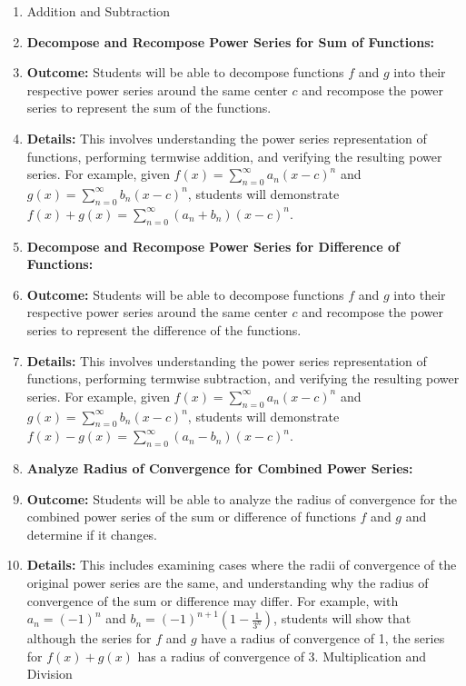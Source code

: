 \begin{enumerate}
    \item Addition and Subtraction
    \item \textbf{Decompose and Recompose Power Series for Sum of Functions:}
    \item \textbf{Outcome:} Students will be able to decompose functions \( f \) and \( g \) into their respective power series around the same center \( c \) and recompose the power series to represent the sum of the functions.
    \item \textbf{Details:} This involves understanding the power series representation of functions, performing termwise addition, and verifying the resulting power series. For example, given \( f(x) = \sum_{n=0}^\infty a_n (x - c)^n \) and \( g(x) = \sum_{n=0}^\infty b_n (x - c)^n \), students will demonstrate \( f(x) + g(x) = \sum_{n=0}^\infty (a_n + b_n) (x - c)^n \).
    \item \textbf{Decompose and Recompose Power Series for Difference of Functions:}
    \item \textbf{Outcome:} Students will be able to decompose functions \( f \) and \( g \) into their respective power series around the same center \( c \) and recompose the power series to represent the difference of the functions.
    \item \textbf{Details:} This involves understanding the power series representation of functions, performing termwise subtraction, and verifying the resulting power series. For example, given \( f(x) = \sum_{n=0}^\infty a_n (x - c)^n \) and \( g(x) = \sum_{n=0}^\infty b_n (x - c)^n \), students will demonstrate \( f(x) - g(x) = \sum_{n=0}^\infty (a_n - b_n) (x - c)^n \).
    \item \textbf{Analyze Radius of Convergence for Combined Power Series:}
    \item \textbf{Outcome:} Students will be able to analyze the radius of convergence for the combined power series of the sum or difference of functions \( f \) and \( g \) and determine if it changes.
    \item \textbf{Details:} This includes examining cases where the radii of convergence of the original power series are the same, and understanding why the radius of convergence of the sum or difference may differ. For example, with \( a_n = (-1)^n \) and \( b_n = (-1)^{n+1} \left(1 - \frac{1}{3^n}\right) \), students will show that although the series for \( f \) and \( g \) have a radius of convergence of 1, the series for \( f(x) + g(x) \) has a radius of convergence of 3. Multiplication and Division

\end{enumerate}
